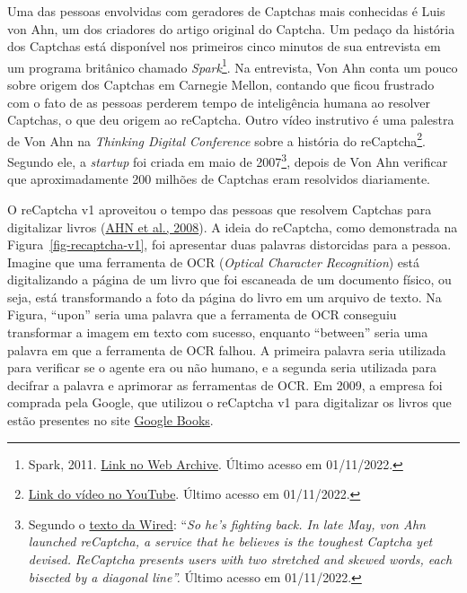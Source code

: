 \documentclass[12pt,twoside,brazilian]{book}
\begin{document}
Uma das pessoas envolvidas com geradores de Captchas mais conhecidas é
Luis von Ahn, um dos criadores do artigo original do Captcha. Um pedaço
da história dos Captchas está disponível nos primeiros cinco minutos de
sua entrevista em um programa britânico chamado \emph{Spark}\footnote{Spark,
  2011.
  \href{https://web.archive.org/web/20120603142110/http://www.cbc.ca/spark/2011/11/full-interview-luis-von-ahn-on-duolingo/}{Link
  no Web Archive}. Último acesso em 01/11/2022.}. Na entrevista, Von Ahn
conta um pouco sobre origem dos Captchas em Carnegie Mellon, contando
que ficou frustrado com o fato de as pessoas perderem tempo de
inteligência humana ao resolver Captchas, o que deu origem ao reCaptcha.
Outro vídeo instrutivo é uma palestra de Von Ahn na \emph{Thinking
Digital Conference} sobre a história do reCaptcha\footnote{\href{https://www.youtube.com/watch?v=i_5ew4btJiQ}{Link
  do vídeo no YouTube}. Último acesso em 01/11/2022.}. Segundo ele, a
\emph{startup} foi criada em maio de 2007\footnote{Segundo o
  \href{https://www.wired.com/2007/06/ff-humancomp/}{texto da Wired}:
  ``\emph{So he's fighting back. In late May, von Ahn launched
  reCaptcha, a service that he believes is the toughest Captcha yet
  devised. ReCaptcha presents users with two stretched and skewed words,
  each bisected by a diagonal line''.} Último acesso em 01/11/2022.},
depois de Von Ahn verificar que aproximadamente 200 milhões de Captchas
eram resolvidos diariamente.

O reCaptcha v1 aproveitou o tempo das pessoas que resolvem Captchas para
digitalizar livros
(\protect\hyperlink{ref-vonahnReCAPTCHAHumanBasedCharacter2008}{AHN et
al., 2008}). A ideia do reCaptcha, como demonstrada na
Figura~\ref{fig-recaptcha-v1}, foi apresentar duas palavras distorcidas
para a pessoa. Imagine que uma ferramenta de OCR (\emph{Optical
Character Recognition}) está digitalizando a página de um livro que foi
escaneada de um documento físico, ou seja, está transformando a foto da
página do livro em um arquivo de texto. Na Figura, ``upon'' seria uma
palavra que a ferramenta de OCR conseguiu transformar a imagem em texto
com sucesso, enquanto ``between'' seria uma palavra em que a ferramenta
de OCR falhou. A primeira palavra seria utilizada para verificar se o
agente era ou não humano, e a segunda seria utilizada para decifrar a
palavra e aprimorar as ferramentas de OCR. Em 2009, a empresa foi
comprada pela Google, que utilizou o reCaptcha v1 para digitalizar os
livros que estão presentes no site
\href{https://books.google.com.br/}{Google Books}.
\end{document}
